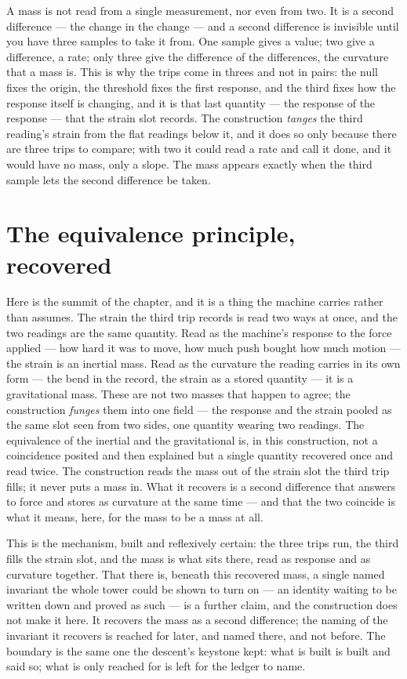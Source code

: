 A mass is not read from a single measurement, nor even from two. It is a second difference --- the change
in the change --- and a second difference is invisible until you have three samples to take it from. One
sample gives a value; two give a difference, a rate; only three give the difference of the differences, the
curvature that a mass is. This is why the trips come in threes and not in pairs: the null fixes the origin,
the threshold fixes the first response, and the third fixes how the response itself is changing, and it is
that last quantity --- the response of the response --- that the strain slot records. The construction
\emph{tanges} the third reading's strain from the flat readings below it, and it does so only because there
are three trips to compare; with two it could read a rate and call it done, and it would have no mass, only
a slope. The mass appears exactly when the third sample lets the second difference be taken.

\section{The equivalence principle, recovered}
\label{se:equivalence-principle-recovered}

Here is the summit of the chapter, and it is a thing the machine carries rather than assumes. The strain the
third trip records is read two ways at once, and the two readings are the same quantity. Read as the
machine's response to the force applied --- how hard it was to move, how much push bought how much motion ---
the strain is an inertial mass. Read as the curvature the reading carries in its own form --- the bend in
the record, the strain as a stored quantity --- it is a gravitational mass. These are not two masses that
happen to agree; the construction \emph{funges} them into one field --- the response and the strain pooled as
the same slot seen from two sides, one quantity wearing two readings. The equivalence of the inertial and the gravitational is, in this construction, not a coincidence
posited and then explained but a single quantity recovered once and read twice. The construction reads the
mass out of the strain slot the third trip fills; it never puts a mass in. What it recovers is a second
difference that answers to force and stores as curvature at the same time --- and that the two coincide is
what it means, here, for the mass to be a mass at all.

This is the mechanism, built and reflexively certain: the three trips run, the third fills the strain slot,
and the mass is what sits there, read as response and as curvature together. That there is, beneath this
recovered mass, a single named invariant the whole tower could be shown to turn on --- an identity waiting to
be written down and proved as such --- is a further claim, and the construction does not make it here. It
recovers the mass as a second difference; the naming of the invariant it recovers is reached for later, and
named there, and not before. The boundary is the same one the descent's keystone kept: what is built is
built and said so; what is only reached for is left for the ledger to name.

